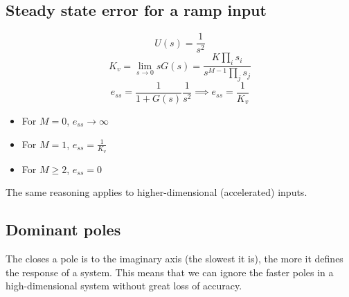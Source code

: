 \subsection*{Steady state error for a ramp input}

\[
    U(s)=\frac{1}{s^{2}}
\] 
\[
    K_v = \lim_{s \to 0} s G(s) = \frac{K \prod_{i} s_i}{s^{M-1}\prod_{j} s_j }
\] 
\[
    e_{ss} = \frac{1}{1+G(s)}\frac{1}{s^2} \implies e_{ss} = \frac{1}{K_v}
\]

\begin{itemize}
    \item For $M=0$, $e_{ss}\to \infty$
    \item For $M=1$, $e_{ss}=\frac{1}{K_v}$ 
    \item For $M\ge 2$, $e_{ss}=0$
\end{itemize}

The same reasoning applies to higher-dimensional (accelerated) inputs.

\subsection*{Dominant poles}

The closes a pole is to the imaginary axis (the slowest it is), the more it defines the response
of a system. This means that we can ignore the faster poles in a high-dimensional system without
great loss of accuracy.
